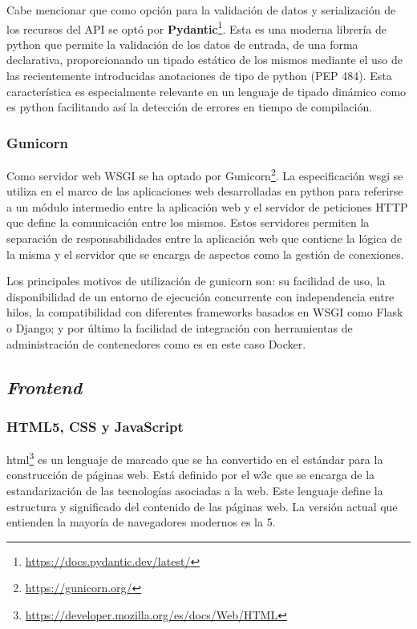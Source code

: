 Cabe mencionar que como opción para la validación de datos y serialización de los recursos del API se optó por \textbf{Pydantic}\footnote{\url{https://docs.pydantic.dev/latest/}}. Esta es una moderna librería de python que permite la validación de los datos de entrada, de una forma declarativa, proporcionando un tipado estático de los mismos mediante el uso de las recientemente introducidas anotaciones de tipo de python (PEP 484). Esta característica es especialmente relevante en un lenguaje de tipado dinámico como es python facilitando así la detección de errores en tiempo de compilación.

\subsubsection{Gunicorn}

Como servidor web WSGI se ha optado por Gunicorn\footnote{\url{https://gunicorn.org/}}. La especificación \acrfull{wsgi} se utiliza en el marco de las aplicaciones web desarrolladas en python para referirse a un módulo intermedio entre la aplicación web y el servidor de peticiones HTTP que define la comunicación entre los mismos. Estos servidores permiten la separación de responsabilidades entre la aplicación web que contiene la lógica de la misma y el servidor que se encarga de aspectos como la gestión de conexiones.

Los principales motivos de utilización de gunicorn son: su facilidad de uso, la disponibilidad de un entorno de ejecución concurrente con independencia entre hilos, la compatibilidad con diferentes frameworks basados en WSGI como Flask o Django; y por último la facilidad de integración con herramientas de administración de contenedores como es en este caso Docker.

\subsection{\textit{Frontend}}
\subsubsection{HTML5, CSS y JavaScript}

\acrfull{html}\footnote{\url{https://developer.mozilla.org/es/docs/Web/HTML}} es un lenguaje de marcado que se ha convertido en el estándar para la construcción de páginas web. Está definido por el \acrfull{w3c} que se encarga de la estandarización de las tecnologías asociadas a la web. Este lenguaje define la estructura y significado del contenido de las páginas web. La versión actual que entienden la mayoría de navegadores modernos es la 5.

